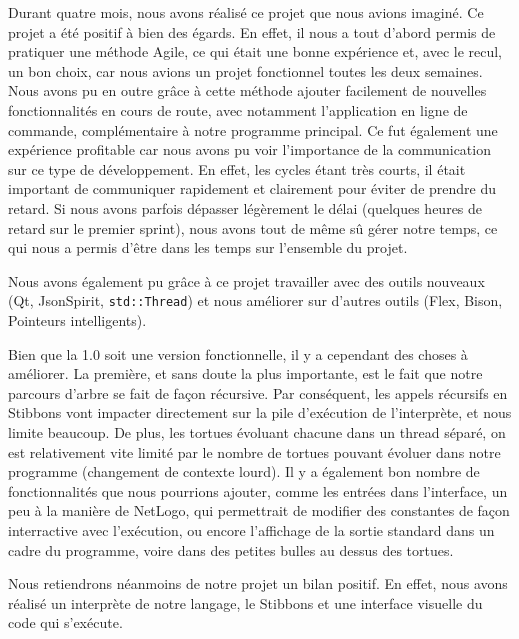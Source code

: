 Durant quatre mois, nous avons réalisé ce projet que nous avions imaginé.
Ce projet a été positif à bien des égards. En effet, il nous a tout d'abord permis de pratiquer une méthode Agile, ce qui était une bonne expérience et, avec le recul, un bon choix, car nous avions un projet fonctionnel toutes les deux semaines.
Nous avons pu en outre grâce à cette méthode ajouter facilement de nouvelles fonctionnalités en cours de route, avec notamment l'application en ligne de commande, complémentaire à notre programme principal.
Ce fut également une expérience profitable car nous avons pu voir l'importance de la communication sur ce type de développement. En effet, les cycles étant très courts, il était important de communiquer rapidement et clairement pour éviter de prendre du retard. Si nous avons parfois dépasser légèrement le délai (quelques heures de retard sur le premier sprint), nous avons tout de même sû gérer notre temps, ce qui nous a permis d'être dans les temps sur l'ensemble du projet.

Nous avons également pu grâce à ce projet travailler avec des outils nouveaux (Qt, JsonSpirit, \verb|std::Thread|) et nous améliorer sur d'autres outils (Flex, Bison, Pointeurs intelligents).

Bien que la 1.0 soit une version fonctionnelle, il y a cependant des choses à améliorer. La première, et sans doute la plus importante, est le fait que notre parcours d'arbre se fait de façon récursive. Par conséquent, les appels récursifs en Stibbons vont impacter directement sur la pile d'exécution de l'interprète, et nous limite beaucoup.
De plus, les tortues évoluant chacune dans un thread séparé, on est relativement vite limité par le nombre de tortues pouvant évoluer dans notre programme (changement de contexte lourd).
Il y a également bon nombre de fonctionnalités que nous pourrions ajouter, comme les entrées dans l'interface, un peu à la manière de NetLogo, qui permettrait de modifier des constantes de façon interractive avec l'exécution, ou encore l'affichage de la sortie standard dans un cadre du programme, voire dans des petites bulles au dessus des tortues.

Nous retiendrons néanmoins de notre projet un bilan positif. En effet, nous avons réalisé un interprète de notre langage, le Stibbons et une interface visuelle du code qui s'exécute.
